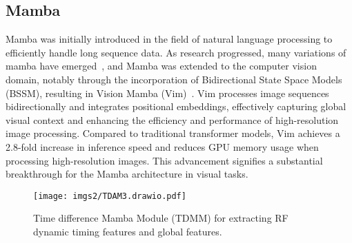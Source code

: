 \vspace{-0.8em}
\subsection{Mamba}
Mamba \cite{gu2022efficiently} was initially introduced in the field of natural language processing to efficiently handle long sequence data. As research progressed, many variations of mamba have emerged~\cite{fu2023hungry,mehta2023long,smith2023simplified,xie2024fusionmamba,luo2024physmamba}, and Mamba was extended to the computer vision domain, notably through the incorporation of Bidirectional State Space Models (BSSM), resulting in Vision Mamba (Vim)~\cite{zhu2024vision}. Vim processes image sequences bidirectionally and integrates positional embeddings, effectively capturing global visual context and enhancing the efficiency and performance of high-resolution image processing. Compared to traditional transformer models, Vim achieves a 2.8-fold increase in inference speed and reduces GPU memory usage when processing high-resolution images. This advancement signifies a substantial breakthrough for the Mamba architecture in visual tasks.


\begin{figure}
\centering
\texttt{[image: imgs2/TDAM3.drawio.pdf]}
\vspace{-1.5em}
\caption{Time difference Mamba Module (TDMM) for extracting RF dynamic timing features and global features. }
\label{fig:domain adaptation}
\vspace{-0.2em}
\end{figure}

\vspace{-0.5em}